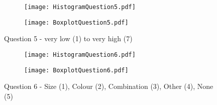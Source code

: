 \begin{figure}[htbp] %
\begin{center} 
\begin{subfigure} 
\centering
\texttt{[image: HistogramQuestion5.pdf]}
\end{subfigure} 
\begin{subfigure} 
\centering
\texttt{[image: BoxplotQuestion5.pdf]}
\end{subfigure}
  \caption[Question 5 - Histogram and Box plot]{Question 5 - very low (1) to very high (7)}
    \label{Question5} 
\end{center}
\end{figure}
\begin{figure}[htbp] %
\begin{center} 
\begin{subfigure} 
\centering
\texttt{[image: HistogramQuestion6.pdf]}
\end{subfigure} 
\begin{subfigure} 
\centering
\texttt{[image: BoxplotQuestion6.pdf]}
\end{subfigure}
  \caption[Question 6 - Histogram and Box plot]{Question 6 - Size (1), Colour (2), Combination (3), Other (4), None (5)}
    \label{Question6} 
\end{center}
\end{figure}
